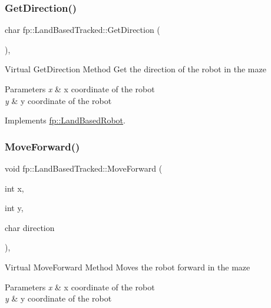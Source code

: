 \subsubsection{\texorpdfstring{Get\+Direction()}{GetDirection()}}
{\footnotesize\ttfamily char fp\+::\+Land\+Based\+Tracked\+::\+Get\+Direction (\begin{DoxyParamCaption}{ }\end{DoxyParamCaption})\hspace{0.3cm}{\ttfamily [override]}, {\ttfamily [virtual]}}

Virtual Get\+Direction Method Get the direction of the robot in the maze 
\begin{DoxyParams}{Parameters}
{\em x} & x coordinate of the robot \\
\hline
{\em y} & y coordinate of the robot \\
\hline
\end{DoxyParams}


Implements \hyperlink{classfp_1_1_land_based_robot_a50841b6e40d4e92832770d26b427fea2}{fp\+::\+Land\+Based\+Robot}.

\mbox{\label{classfp_1_1_land_based_tracked_a3f4290b614fe0e31e361366e71501cea}} 
\subsubsection{\texorpdfstring{Move\+Forward()}{MoveForward()}}
{\footnotesize\ttfamily void fp\+::\+Land\+Based\+Tracked\+::\+Move\+Forward (\begin{DoxyParamCaption}\item[{int}]{x,  }\item[{int}]{y,  }\item[{char}]{direction }\end{DoxyParamCaption})\hspace{0.3cm}{\ttfamily [override]}, {\ttfamily [virtual]}}

Virtual Move\+Forward Method Moves the robot forward in the maze 
\begin{DoxyParams}{Parameters}
{\em x} & x coordinate of the robot \\
\hline
{\em y} & y coordinate of the robot \\
\hline
\end{DoxyParams}


